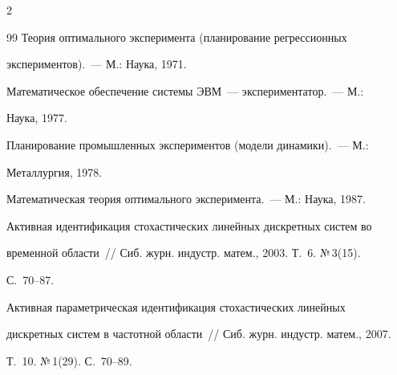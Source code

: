 \begin{multicols}{2}
{{\begin{thebibliography}{99}
Теория оптимального эксперимента (планирование регрессионных


экспериментов).~--- М.: Наука, 1971.









Математическое обеспечение системы ЭВМ~--- экспериментатор.~--- М.:


Наука, 1977.









Планирование промышленных экспериментов (модели динамики).~--- М.:


Металлургия, 1978.









Математическая теория оптимального эксперимента.~--- М.: Наука, 1987.












Активная идентификация стохастических линейных дискретных систем во


временной области~// Сиб. журн. индустр. матем., 2003. Т.~6. №\,3(15).


С.~70--87.









Активная параметрическая идентификация стохастических линейных


дискретных систем в частотной области~// Сиб. журн. индустр. матем., 2007.


Т.~10. №\,1(29). С.~70--89.










\end{thebibliography}}}
\end{multicols}
